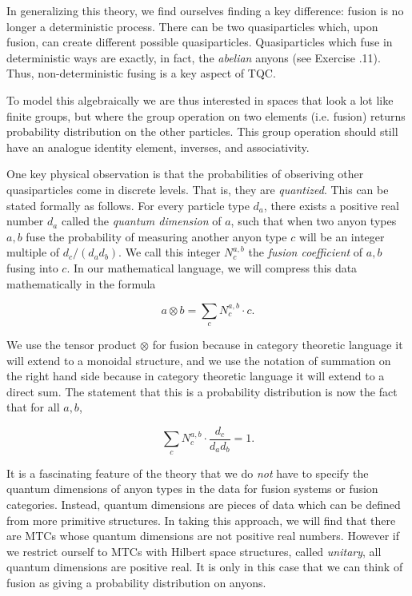 \documentclass{article}
\theoremstyle{definition}
\numberwithin{figure}{section}
\begin{document}
In generalizing this theory, we find ourselves finding a key difference: fusion is no longer a deterministic process. There can be two quasiparticles which, upon fusion, can create different possible quasiparticles. Quasiparticles which fuse in deterministic ways are exactly, in fact, the \textit{abelian} anyons (see Exercise \thesection.11). Thus, non-deterministic fusing is a key aspect of TQC.

To model this algebraically we are thus interested in spaces that look a lot like finite groups, but where the group operation on two elements (i.e. fusion) returns probability distribution on the other particles. This group operation should still have an analogue identity element, inverses, and associativity.

One key physical observation is that the probabilities of obseriving other quasiparticles come in discrete levels. That is, they are \textit{quantized}. This can be stated formally as follows. For every particle type $d_a$, there exists  a positive real number $d_a$ called the \textit{quantum dimension} of $a$, such that when two anyon types $a,b$ fuse the probability of measuring another anyon type $c$ will be an integer multiple of $d_c/(d_ad_b)$. We call this integer $N^{a,b}_c$ the \textit{fusion coefficient} of $a,b$ fusing into $c$. In our mathematical language, we will compress this data mathematically in the formula

$$a\otimes b = \sum_{c} N^{a,b}_c \cdot c.$$

We use the tensor product $\otimes$ for fusion because in category theoretic language it will extend to a monoidal structure, and we use the notation of summation on the right hand side because in category theoretic language it will extend to a direct sum. The statement that this is a probability distribution is now the fact that for all $a,b$,

$$\sum_{c}N^{a,b}_c \cdot \frac{d_c}{d_a d_b}=1.$$

It is a fascinating feature of the theory that we do \textit{not} have to specify the quantum dimensions of anyon types in the data for fusion systems or fusion categories. Instead, quantum dimensions are pieces of data which can be defined from more primitive structures. In taking this approach, we will find that there are MTCs whose quantum dimensions are not positive real numbers. However if we restrict ourself to MTCs with Hilbert space structures, called \textit{unitary}, all quantum dimensions are positive real. It is only in this case that we can think of fusion as giving a probability distribution on anyons.
\end{document}
